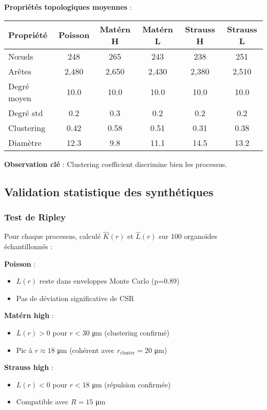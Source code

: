 \textbf{Propriétés topologiques moyennes} :

\begin{tabular}{lccccc}
\hline
Propriété & Poisson & Matérn H & Matérn L & Strauss H & Strauss L \\
\hline
Nœuds & 248 & 265 & 243 & 238 & 251 \\
Arêtes & 2,480 & 2,650 & 2,430 & 2,380 & 2,510 \\
Degré moyen & 10.0 & 10.0 & 10.0 & 10.0 & 10.0 \\
Degré std & 0.2 & 0.3 & 0.2 & 0.2 & 0.2 \\
Clustering & 0.42 & 0.58 & 0.51 & 0.31 & 0.38 \\
Diamètre & 12.3 & 9.8 & 11.1 & 14.5 & 13.2 \\
\hline
\end{tabular}

\textbf{Observation clé} : Clustering coefficient discrimine bien les processus.

\subsection{Validation statistique des synthétiques}

\subsubsection{Test de Ripley}

Pour chaque processus, calculé $\hat{K}(r)$ et $\hat{L}(r)$ sur 100 organoïdes échantillonnés :

\textbf{Poisson} :
\begin{itemize}
    \item $L(r)$ reste dans enveloppes Monte Carlo (p=0.89)
    \item Pas de déviation significative de CSR
\end{itemize}

\textbf{Matérn high} :
\begin{itemize}
    \item $L(r) > 0$ pour $r < 30$ μm (clustering confirmé)
    \item Pic à $r \approx 18$ μm (cohérent avec $r_{\text{cluster}} = 20$ μm)
\end{itemize}

\textbf{Strauss high} :
\begin{itemize}
    \item $L(r) < 0$ pour $r < 18$ μm (répulsion confirmée)
    \item Compatible avec $R = 15$ μm
\end{itemize}

